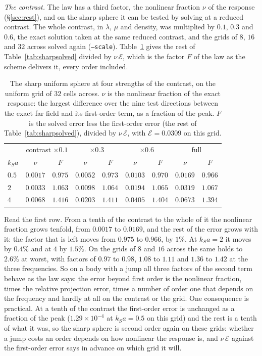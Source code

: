 \documentclass[11pt,a4paper]{article}
\newcommand{\cE}{\mathcal{E}}
\begin{document}
\emph{The contrast.} The law has a third factor, the nonlinear fraction $\nu$ of the response
(\S\ref{sec:rest}), and on the sharp sphere it can be tested by solving at a reduced contrast. The whole
contrast, in $\lambda$, $\mu$ and density, was multiplied by $0.1$, $0.3$ and $0.6$, the exact solution
taken at the same reduced contrast, and the grids of $8$, $16$ and $32$ across solved again
(\texttt{--scale}). Table~\ref{tab:sharpcontrast} gives the rest of Table~\ref{tab:sharpsolved} divided
by $\nu\,\cE$, which is the factor $F$ of the law as the scheme delivers it, every order included.
\begin{table}[htbp]
\centering
\caption{The sharp uniform sphere at four strengths of the contrast, on the uniform grid of $32$ cells
across. $\nu$ is the nonlinear fraction of the exact response: the largest difference over the nine test
directions between the exact far field and its first-order term, as a fraction of the peak. $F$ is the
solved error less the first-order error (the rest of Table~\ref{tab:sharpsolved}), divided by
$\nu\,\cE$, with $\cE=0.0309$ on this grid.}\label{tab:sharpcontrast}
\small
\begin{tabular}{@{}lcccccccc@{}}
\toprule
 & \multicolumn{2}{c}{contrast $\times0.1$} & \multicolumn{2}{c}{$\times0.3$} & \multicolumn{2}{c}{$\times0.6$} & \multicolumn{2}{c}{full} \\
$k_Sa$ & $\nu$ & $F$ & $\nu$ & $F$ & $\nu$ & $F$ & $\nu$ & $F$ \\
\midrule
$0.5$ & $0.0017$ & $0.975$ & $0.0052$ & $0.973$ & $0.0103$ & $0.970$ & $0.0169$ & $0.966$ \\
$2$   & $0.0033$ & $1.063$ & $0.0098$ & $1.064$ & $0.0194$ & $1.065$ & $0.0319$ & $1.067$ \\
$4$   & $0.0068$ & $1.416$ & $0.0203$ & $1.411$ & $0.0405$ & $1.404$ & $0.0673$ & $1.394$ \\
\bottomrule
\end{tabular}
\end{table}

Read the first row. From a tenth of the contrast to the whole of it the nonlinear fraction grows
tenfold, from $0.0017$ to $0.0169$, and the rest of the error grows with it: the factor that is left
moves from $0.975$ to $0.966$, by $1\%$. At $k_Sa=2$ it moves by $0.4\%$ and at $4$ by $1.5\%$. On the
grids of $8$ and $16$ across the same holds to $2.6\%$ at worst, with factors of $0.97$ to
$0.98$, $1.08$ to $1.11$ and $1.36$ to $1.42$ at the three frequencies. So on a body with a jump all
three factors of the second term behave as the law says: the error beyond first order is the nonlinear
fraction, times the relative projection error, times a number of order one that depends on the frequency
and hardly at all on the contrast or the grid. One consequence is practical. At a tenth of the contrast
the first-order error is unchanged as a fraction of the peak ($1.29\times10^{-4}$ at $k_Sa=0.5$ on this
grid) and the rest is a tenth of what it was, so the sharp sphere is second order again on these grids:
whether a jump costs an order depends on how nonlinear the response is, and $\nu\,\cE$ against the
first-order error says in advance on which grid it will.
\end{document}
